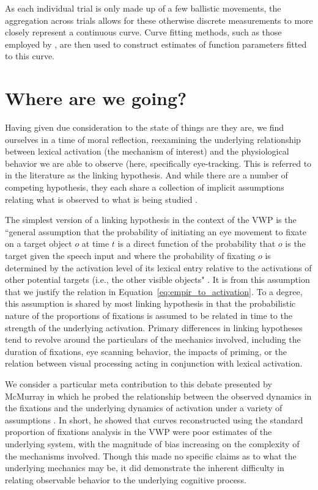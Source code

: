 As each individual trial is only made up of a few ballistic movements, the aggregation across trials allows for these otherwise discrete measurements to more closely represent a continuous curve. Curve fitting methods, such as those employed by , are then used to construct estimates of function parameters fitted to this curve.

\section{Where are we going?} 


Having given due consideration to the state of things are they are, we find ourselves in a time of moral reflection, reexamining the underlying relationship between lexical activation (the mechanism of interest) and the physiological behavior we are able to observe (here, specifically eye-tracking. This is referred to in the literature as the linking hypothesis. And while there are a number of competing hypothesis, they each share a collection of implicit assumptions relating what is observed to what is being studied \cite{Magnuson2019}.

The simplest version of a linking hypothesis in the context of the VWP is the ``general assumption that the probability of initiating an eye movement to fixate on a target object $o$ at time $t$ is a direct function of the probability that $o$ is the target given the speech input and where the probability of fixating $o$ is determined by the activation level of its lexical entry relative to the activations of other potential targets (i.e., the other visible objects" \cite{allopenna1998tracking}. It is from this assumption that we justify the relation in Equation~\ref{eq:empir_to_activation}. To a degree, this assumption is shared by most linking hypothesis in that the probabilistic nature of the proportions of fixations is assumed to be related in time to the strength of the underlying activation. Primary differences in linking hypotheses tend to revolve around the particulars of the mechanics involved, including the duration of fixations, eye scanning behavior, the impacts of priming, or the relation between visual  processing acting in conjunction with lexical activation.

We consider a particular meta contribution to this debate presented by McMurray in which he probed the relationship between the observed dynamics in the fixations and the underlying dynamics of activation under a variety of assumptions \cite{mcmurray2022m}. In short, he showed that curves reconstructed using the standard proportion of fixations analysis in the VWP were poor estimates of the underlying system, with the magnitude of bias increasing on the complexity of the mechanisms involved. Though this made no specific claims as to what the underlying mechanics may be, it did demonstrate the inherent difficulty in relating observable behavior to the underlying cognitive process.

